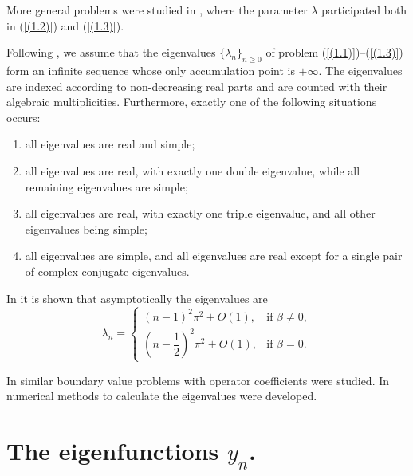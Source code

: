 \documentclass[pdflatex,sn-mathphys-num]{sn-jnl}%
\theoremstyle{thmstyleone}%
\theoremstyle{thmstyletwo}%
\theoremstyle{thmstylethree}%
\theoremstyle{definition}
\theoremstyle{remark}
\numberwithin{equation}{section}
\begin{document}
More general problems were studied in \cite{shkalikov2,kerimov0}, where the parameter $\lambda$ participated both in (\ref{(1.2)}) and (\ref{(1.3)}).

Following \cite{binding1}, we assume that the eigenvalues
$\{\lambda_n\}_{n\ge0}$ of problem (\ref{(1.1)})--(\ref{(1.3)})
form an infinite sequence whose only accumulation point is $+\infty$.
The eigenvalues are indexed according to non-decreasing real parts and
are counted with their algebraic multiplicities. Furthermore, exactly
one of the following situations occurs:

\begin{enumerate}
\item[(i)] all eigenvalues are real and simple;

\item[(ii)] all eigenvalues are real, with exactly one double eigenvalue,
while all remaining eigenvalues are simple;

\item[(iii)] all eigenvalues are real, with exactly one triple
eigenvalue, and all other eigenvalues being simple;

\item[(iv)] all eigenvalues are simple, and all eigenvalues are real
except for a single pair of complex conjugate eigenvalues.
\end{enumerate}
In \cite[Theorem~2.2]{binding2} it is shown that asymptotically the eigenvalues are
\begin{equation}
\lambda_n =
\begin{cases}
\left(n-1\right)^2\pi^2 + O(1), & \text{if } \beta \neq 0,\\[6pt]
\left(n-\dfrac{1}{2}\right)^2\pi^2 + O(1), & \text{if } \beta = 0.
\end{cases}\label{(1.4)}
\end{equation}

In \cite{aslanova, aslanova1} similar boundary value problems with operator coefficients were studied. In \cite{chein, liu} numerical methods  to calculate the eigenvalues were developed. 

\section{The eigenfunctions $y_{n}$.}\label{sec2}
\end{document}
